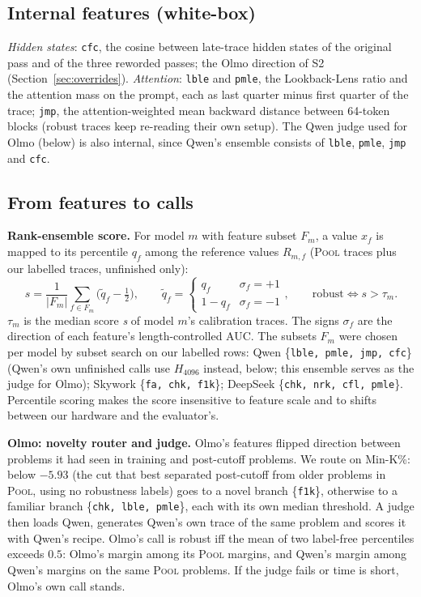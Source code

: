 \documentclass{article}
\newcommand{\stwo}{\textsc{S2}}
\begin{document}
\subsection{Internal features (white-box)}
\emph{Hidden states}: \texttt{cfc}, the cosine between late-trace hidden states of the original pass and of the three reworded passes; the Olmo direction of \stwo{} (Section~\ref{sec:overrides}).
\emph{Attention}: \texttt{lble} and \texttt{pmle}, the Lookback-Lens ratio \citep{chuang2024lookback} and the attention mass on the prompt, each as last quarter minus first quarter of the trace; \texttt{jmp}, the attention-weighted mean backward distance between 64-token blocks (robust traces keep re-reading their own setup).
The Qwen judge used for Olmo (below) is also internal, since Qwen's ensemble consists of \texttt{lble}, \texttt{pmle}, \texttt{jmp} and \texttt{cfc}.

\subsection{From features to calls}
\textbf{Rank-ensemble score.} For model $m$ with feature subset $F_m$, a value $x_f$ is mapped to its percentile $q_f$ among the reference values $R_{m,f}$ (\textsc{Pool} traces plus our labelled traces, unfinished only):
\begin{equation}
  s = \frac{1}{|F_m|}\sum_{f\in F_m}\big(\tilde q_f - \tfrac12\big),\qquad \tilde q_f = \begin{cases} q_f & \sigma_f=+1\\ 1-q_f & \sigma_f=-1\end{cases},\qquad \text{robust} \iff s>\tau_m .
\end{equation}
$\tau_m$ is the median score \textit{s} of model $m$'s calibration traces. The signs $\sigma_f$ are the direction of each feature's length-controlled AUC.
The subsets $F_m$ were chosen per model by subset search on our labelled rows:
Qwen \{\texttt{lble, pmle, jmp, cfc}\} (Qwen's own unfinished calls use $H_{4096}$ instead, below; this ensemble serves as the judge for Olmo); Skywork \{\texttt{fa, chk, f1k}\}; DeepSeek \{\texttt{chk, nrk, cfl, pmle}\}.
Percentile scoring makes the score insensitive to feature scale and to shifts between our hardware and the evaluator's.

\textbf{Olmo: novelty router and judge.} Olmo's features flipped direction between problems it had seen in training and post-cutoff problems.
We route on Min-K\%: below $-5.93$ (the cut that best separated post-cutoff from older problems in \textsc{Pool}, using no robustness labels) goes to a novel branch \{\texttt{f1k}\}, otherwise to a familiar branch \{\texttt{chk, lble, pmle}\}, each with its own median threshold.
A judge then loads Qwen, generates Qwen's own trace of the same problem and scores it with Qwen's recipe. Olmo's call is robust iff the mean of two label-free percentiles exceeds $0.5$: Olmo's margin among its \textsc{Pool} margins, and Qwen's margin among Qwen's margins on the same \textsc{Pool} problems. If the judge fails or time is short, Olmo's own call stands.
\end{document}

